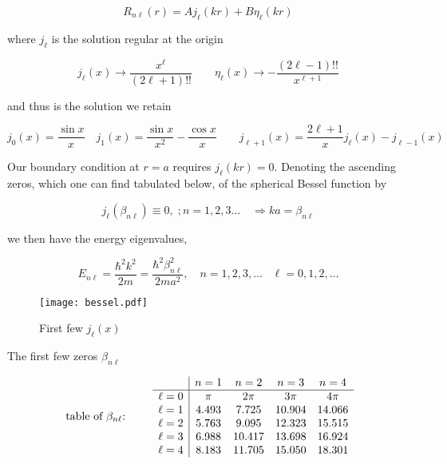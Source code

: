 \[
  R_{n\ell }(r) = Aj_\ell (kr) + B\eta_\ell (kr)
\] \vspace{3px}

where $j_\ell $ is the solution regular at the origin 

\[
j_\ell (x) \rightarrow \frac{x^{\ell }}{(2\ell +1)!!} \qquad \eta_\ell (x)
\rightarrow - \frac{(2\ell -1)!!}{x^{\ell +1}}
\] \vspace{3px}

and thus is the solution we retain 

\[
j_0(x) = \frac{\sin x}{x} \quad j_1(x) = \frac{\sin x}{x^2} - \frac{\cos x}{x}
\qquad j_{\ell +1} (x) = \frac{2\ell +1}{x}j_\ell (x) - j_{\ell - 1}(x) 
\] \vspace{3px}

Our boundary condition at $r =a$ requires $j_\ell (kr) = 0$. Denoting the
ascending zeros, which one can find tabulated below, of the spherical Bessel
function by 

\[
  j_\ell (\beta_{n\ell})\equiv 0, \; ; n = 1,2,3\hdots \quad \Rightarrow ka
  = \beta_{n\ell }
\] \vspace{3px}

we then have the energy eigenvalues, 

\[
  E_{n\ell } = \frac{\hbar^2 k^2}{2m} = \frac{\hbar^2 \beta_{n \ell
  }^2}{2ma^2}, \quad  n = 1,2,3,\hdots \;\;\;\ell = 0,1, 2, \hdots
\] \vspace{3px}




\begin{figure}[H]
  \centering
    \texttt{[image: bessel.pdf]}
    \caption{First few $j_\ell (x)$}
\end{figure}

The first few zeros $\beta_{n\ell}$


\[ \text{ table of $\beta_{n \ell}$: } \qquad  
\begin{array}{c|c c c c}
 & n=1 & n=2 & n=3 & n=4 \\
\hline
\ell = 0 & \pi & 2\pi & 3\pi & 4\pi \\
\ell = 1 & 4.493 & 7.725 & 10.904 & 14.066 \\
\ell = 2 & 5.763 & 9.095 & 12.323 & 15.515 \\
\ell = 3 & 6.988 & 10.417 & 13.698 & 16.924 \\
\ell = 4 & 8.183 & 11.705 & 15.050 & 18.301 \\
\end{array}
\]




